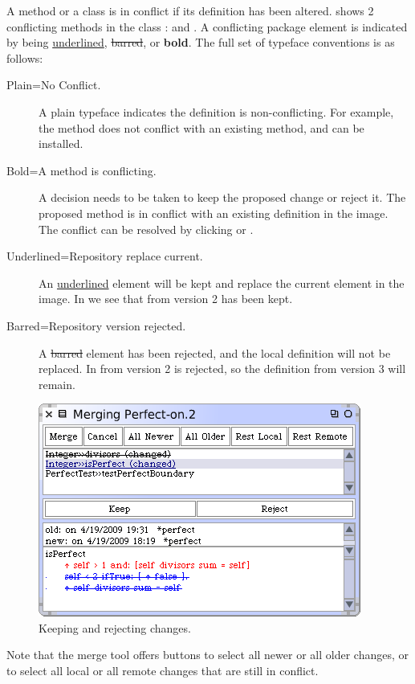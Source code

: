 \documentclass[a4paper,10pt,twoside]{book}
\begin{document}
A method or a class is in conflict if its definition has been altered.  shows 2 conflicting methods in the class :  and . A conflicting package element is indicated by being \underline{underlined}, \sout{barred}, or {\bf bold}. The full set of typeface conventions is as follows:

\begin{description}
\item[Plain=No Conflict.] A plain typeface indicates the definition is non-conflicting. For example, the method  does not conflict with an existing method, and can be installed.
\item[Bold=A method is conflicting.] A decision needs to be taken to keep the proposed change or reject it. The proposed method  is in conflict with an existing definition in the image. The conflict can be resolved by clicking  or .
\item[Underlined=Repository replace current.] An \underline{underlined} element will be kept and replace the current element in the image. In  we see that  from version 2 has been kept.
\item[Barred=Repository version rejected.] A \sout{barred} element has been rejected, and the local definition will not be replaced. In   from version 2 is rejected, so the definition from version 3 will remain.
\end{description}

\begin{figure}[ht]\centering
	\includegraphics[width=.55\textwidth]{keepReject}
	\caption{Keeping and rejecting changes.
	}
\end{figure}

Note that the merge tool offers buttons to select all newer or all older changes, or to select all local or all remote changes that are still in conflict.
\end{document}
